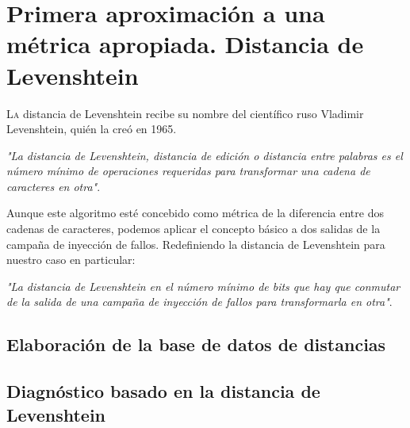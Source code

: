 \chapter{Primera aproximación a una métrica apropiada. Distancia de Levenshtein}
\label{ch:Levenshtein}

\lettrine[lraise=-0.1, lines=2, loversize=0.2]{L}{a} distancia de Levenshtein
recibe su nombre del científico ruso Vladimir Levenshtein, quién la creó en 1965.

\vspace{0.3cm}
\textit{"La distancia de Levenshtein, distancia de edición o distancia entre
palabras es el número mínimo de operaciones requeridas para transformar una cadena
de caracteres en otra"}.
\vspace{-0.2cm}
{}
\vspace{0.3cm}

Aunque este algoritmo esté concebido como métrica de la diferencia entre dos
cadenas de caracteres, podemos aplicar el concepto básico a dos salidas de la
campaña de inyección de fallos. Redefiniendo la distancia de Levenshtein para
nuestro caso en particular:

\vspace{0.3cm}
\textit{"La distancia de Levenshtein en el número mínimo de bits que hay que
conmutar de la salida de una campaña de inyección de fallos para transformarla 
en otra"}.
\vspace{0.3cm}


\section{Elaboración de la base de datos de distancias}
\label{sec:LevenDist}


\section{Diagnóstico basado en la distancia de Levenshtein}
\label{sec:LevenCands}


